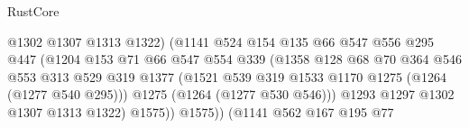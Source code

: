\begin{lexlean}{RustCore}
\begin{coremodule}
                                          @1302
                                          @1307
                                          @1313
                                          @1322)
                                        (@1141
                                          @524
                                          @154
                                          @135
                                          @66
                                          @547
                                          @556
                                          @295
                                          @447
                                          (@1204
                                            @153
                                            @71
                                            @66
                                            @547
                                            @554
                                            @339
                                            (@1358
                                              @128
                                              @68
                                              @70
                                              @364
                                              @546
                                              @553
                                              @313
                                              @529
                                              @319
                                              @1377
                                              (@1521
                                                @539
                                                @319
                                                @1533
                                                @1170
                                                @1275
                                                (@1264 (@1277 @540 @295)))
                                              @1275
                                              (@1264 (@1277 @530 @546)))
                                            @1293
                                            @1297
                                            @1302
                                            @1307
                                            @1313
                                            @1322)
                                          @1575))
                                      @1575))
                                  (@1141
                                    @562
                                    @167
                                    @195
                                    @77

\end{coremodule}
\end{lexlean}
